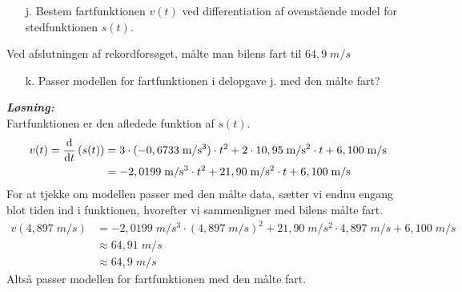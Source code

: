 \documentclass{report}
\newcommand{\sol}{\setlength{\parindent}{0cm}\textbf{\textit{Løsning:}}\setlength{\parindent}{1cm}}
\begin{document}
\begin{question}{}{}
\begin{itemize}
  \item[j.] Bestem fartfunktionen $v(t)$ ved differentiation af ovenstående model for stedfunktionen $s(t)$.
\end{itemize}
Ved afslutningen af rekordforsøget, målte man bilens fart til $64,9 \;\unit{m/s} $
\begin{itemize}
\item[k.] Passer modellen for fartfunktionen i delopgave j. med den målte fart?
\end{itemize}
\end{question}
\sol \\ 
Fartfunktionen er den afledede funktion af $s(t)$.
\begin{equation*}
\begin{split}
  v(t)=\dv{t}\left(s(t)\right)&=3\cdot(-0,6733\;\unit{m/s^3}) \cdot t^2+ 2\cdot 10,95\;\unit{m/s^2} \cdot t+6,100\;\unit{m/s}\\ 
  &= -2,0199 \;\unit{m/s^3}  \cdot t^2 + 21,90 \;\unit{m/s^2} \cdot t + 6,100 \;\unit{m/s}  
\end{split}
\end{equation*}
For at tjekke om modellen passer med den målte data, sætter vi endnu engang blot tiden ind i funktionen, hvorefter vi sammenligner med bilens målte fart.
\begin{equation*}
\begin{split}
  v(4,897 \;\unit{m/s} ) &=-2,0199 \;\unit{m/s^3}  \cdot (4,897 \;\unit{m/s})^2 + 21,90 \;\unit{m/s^2} \cdot 4,897 \;\unit{m/s} + 6,100 \;\unit{m/s}\\ 
  &\approx 64,91 \;\unit{m/s}\\ 
  &\approx 64,9 \;\unit{m/s} 
\end{split}
\end{equation*}
Altså passer modellen for fartfunktionen med den målte fart.
\end{document}
